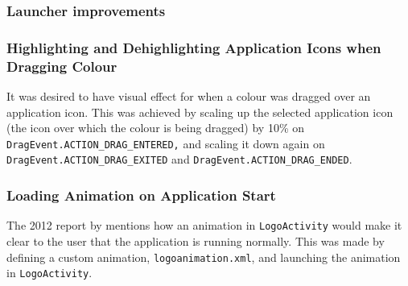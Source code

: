 \subsubsection{Launcher improvements}

\subsubsection*{Highlighting and Dehighlighting Application Icons when Dragging Colour}
It was desired to have visual effect for when a colour was dragged over an application icon.
This was achieved by scaling up the selected application icon (the icon over which the colour is being dragged) by 10\% on \lstinline{DragEvent.ACTION_DRAG_ENTERED,} and scaling it down again on \lstinline{DragEvent.ACTION_DRAG_EXITED} and \lstinline{DragEvent.ACTION_DRAG_ENDED}.

\subsubsection*{Loading Animation on Application Start}
The 2012 report by \citet{launcher2012} mentions how an animation in \lstinline{LogoActivity} would make it clear to the user that the application is running normally.
This was made by defining a custom animation, \lstinline{logoanimation.xml}, and launching the animation in \lstinline{LogoActivity}.

